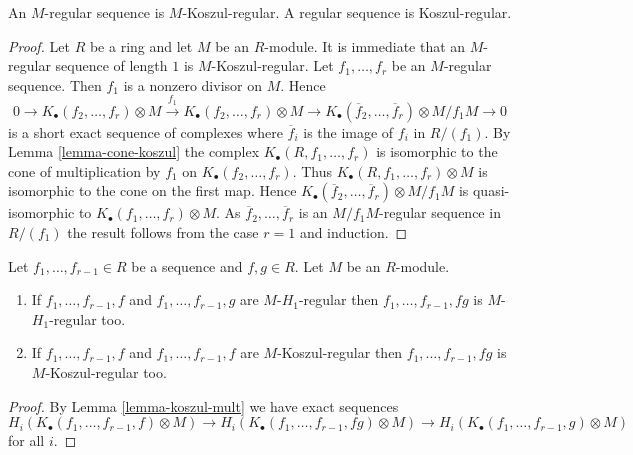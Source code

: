 \begin{lemma}
\label{lemma-regular-koszul-regular}
An $M$-regular sequence is $M$-Koszul-regular.
A regular sequence is Koszul-regular.
\end{lemma}

\begin{proof}
Let $R$ be a ring and let $M$ be an $R$-module.
It is immediate that an $M$-regular sequence of length $1$ is
$M$-Koszul-regular.
Let $f_1, \ldots, f_r$ be an $M$-regular sequence.
Then $f_1$ is a nonzero divisor on $M$. Hence
$$
0 \to K_\bullet(f_2, \ldots, f_r) \otimes M
\xrightarrow{f_1}
K_\bullet(f_2, \ldots, f_r) \otimes M \to
K_\bullet(\overline{f}_2, \ldots, \overline{f}_r) \otimes M/f_1M \to 0
$$
is a short exact sequence of complexes where $\overline{f}_i$
is the image of $f_i$ in $R/(f_1)$. By
Lemma \ref{lemma-cone-koszul}
the complex $K_\bullet(R, f_1, \ldots, f_r)$
is isomorphic to the cone of multiplication by $f_1$
on $K_\bullet(f_2, \ldots, f_r)$. Thus
$K_\bullet(R, f_1, \ldots, f_r) \otimes M$ is isomorphic
to the cone on the first map. Hence
$K_\bullet(\overline{f}_2, \ldots, \overline{f}_r) \otimes M/f_1M$
is quasi-isomorphic to $K_\bullet(f_1, \ldots, f_r) \otimes M$.
As $\overline{f}_2, \ldots, \overline{f}_r$ is an $M/f_1M$-regular sequence
in $R/(f_1)$ the result follows from the case $r = 1$ and induction.
\end{proof}

\begin{lemma}
\label{lemma-mult-koszul-regular}
Let $f_1, \ldots, f_{r - 1} \in R$ be a sequence and $f, g \in R$.
Let $M$ be an $R$-module.
\begin{enumerate}
\item If $f_1, \ldots, f_{r - 1}, f$ and $f_1, \ldots, f_{r - 1}, g$
are $M$-$H_1$-regular then $f_1, \ldots, f_{r - 1}, fg$ is
$M$-$H_1$-regular too.
\item If $f_1, \ldots, f_{r - 1}, f$ and $f_1, \ldots, f_{r - 1}, f$ are
$M$-Koszul-regular then $f_1, \ldots, f_{r - 1}, fg$ is $M$-Koszul-regular
too.
\end{enumerate}
\end{lemma}

\begin{proof}
By
Lemma \ref{lemma-koszul-mult}
we have exact sequences
$$
H_i(K_\bullet(f_1, \ldots, f_{r - 1}, f) \otimes M) \to
H_i(K_\bullet(f_1, \ldots, f_{r - 1}, fg) \otimes M) \to
H_i(K_\bullet(f_1, \ldots, f_{r - 1}, g) \otimes M)
$$
for all $i$.
\end{proof}

